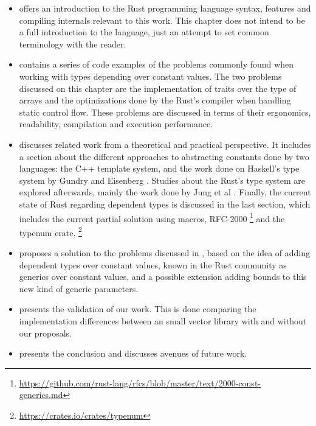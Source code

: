 \begin{itemize}
    \item {} offers an introduction to the Rust
        programming language syntax, features and compiling internals relevant
        to this work. This chapter does not intend to be a full introduction to
        the language, just an attempt to set common terminology with the
        reader.
    \item {} contains a series of code examples of the
        problems commonly found when working with types depending over constant
        values. The two problems discussed on this chapter are the
        implementation of traits over the type of arrays and the optimizations
        done by the Rust's compiler when handling static control flow. These
        problems are discussed in terms of their ergonomics, readability,
        compilation and execution performance.
    \item {} discusses related work from a theoretical
        and practical perspective. It includes a section about the
        different approaches to abstracting constants done by
        two languages: the C++ template system, and the work done on Haskell's type
        system by Gundry \cite{gundry} and Eisenberg \cite{eisenberg}. Studies
        about the Rust's type system are explored afterwards, mainly the work
        done by Jung et al \cite{ralf}. Finally, the current state of Rust
        regarding dependent types is discussed in the last section, which
        includes the current partial solution using macros, RFC-2000
        \footnote{\url{https://github.com/rust-lang/rfcs/blob/master/text/2000-const-generics.md}}
        and the typenum crate.
        \footnote{\url{https://crates.io/crates/typenum}}
    \item {} proposes a solution to the problems discussed in
        , based on the idea of adding dependent types
        over constant values, known in the Rust community as generics over
        constant values, and a possible extension adding bounds to this new
        kind of generic parameters.

    \item {} presents the validation of our work. This is done
        comparing the implementation differences between an small vector
        library with and without our proposals.

    \item {} presents the conclusion and discusses avenues of future
        work.
\end{itemize}
